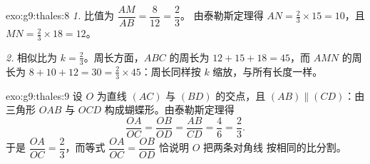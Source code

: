 \begin{solution}{exo:g9:thales:8}
\emph{1.} 比值为 $\dfrac{AM}{AB} = \dfrac{8}{12} = \dfrac23$。
由泰勒斯定理得 $AN = \frac23 \times 15 = 10$，且 $MN = \frac23 \times 18 = 12$。

\emph{2.} 相似比为 $k = \frac23$。周长方面，$ABC$ 的周长为
$12 + 15 + 18 = 45$，而 $AMN$ 的周长为 $8 + 10 + 12 = 30 = \frac23 \times
45$：周长同样按 $k$ 缩放，与所有长度一样。
\end{solution}

\begin{solution}{exo:g9:thales:9}
设 $O$ 为直线 $(AC)$ 与 $(BD)$ 的交点，且
$(AB) \parallel (CD)$：由三角形 $OAB$
与 $OCD$ 构成蝴蝶形。由泰勒斯定理得
\[
\frac{OA}{OC} = \frac{OB}{OD} = \frac{AB}{CD} = \frac46 = \frac23 .
\]
于是 $\dfrac{OA}{OC} = \dfrac23$，而等式
$\dfrac{OA}{OC} = \dfrac{OB}{OD}$ 恰说明 $O$ 把两条对角线
按相同的比分割。
\end{solution}

